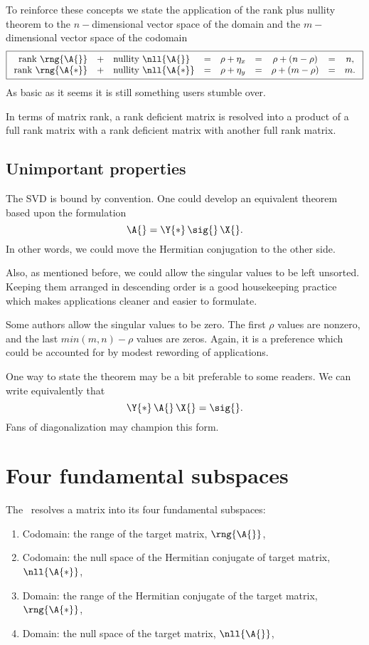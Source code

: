 To reinforce these concepts we state the application of the rank plus nullity theorem to the $n-$dimensional vector space of the domain and the $m-$dimensional vector space of the codomain
\begin{equation}
\boxed{
  \begin{array}{rcllclclcl}
    \text{rank } \rng{\A{}} &+& \text{nullity } \nll{\A{}} & = & \rho + \eta_{x} & = & \rho + (n-\rho) & = & n,\\
    \text{rank } \rng{\A{*}} &+& \text{nullity } \nll{\A{*}} & = & \rho + \eta_{y} & = & \rho + (m-\rho) & = & m.
  \end{array}
}
\end{equation}
As basic as it seems it is still something users stumble over.

In terms of matrix rank, a rank deficient matrix is resolved into a product of a full rank matrix with a rank deficient matrix with another full rank matrix.

%
\subsection{Unimportant properties}
The SVD is bound by convention. One could develop an equivalent theorem based upon the formulation
\begin{equation}
  \A{} = \Y{*}\,\sig{}\,\X{}.
\end{equation}
In other words, we could move the Hermitian conjugation to the other side.

Also, as mentioned before, we could allow the singular values to be left unsorted. Keeping them arranged in descending order is a good housekeeping practice which makes applications cleaner and easier to formulate.

Some authors allow the singular values to be zero. The first $\rho$ values are nonzero, and the last $min(m,n)-\rho$ values are zeros. Again, it is a preference which could be accounted for by modest rewording of applications.

One way to state the theorem may be a bit preferable to some readers. We can write equivalently that
\begin{equation}
  \Y{*}\,\A{}\,\X{} = \sig{}.
\end{equation}
Fans of diagonalization may champion this form.

\section{Four fundamental subspaces}
The \svdl \ resolves a matrix into its four fundamental subspaces:
\begin{enumerate}
\item Codomain: the range of the target matrix, $\rng{\A{}}$,
\item Codomain: the null space of the Hermitian conjugate of target matrix,  $\nll{\A{*}}$,
\item Domain: the range of the Hermitian conjugate of the target matrix, $\rng{\A{*}}$,
\item Domain: the null space of the target matrix,  $\nll{\A{}}$,
\end{enumerate}

